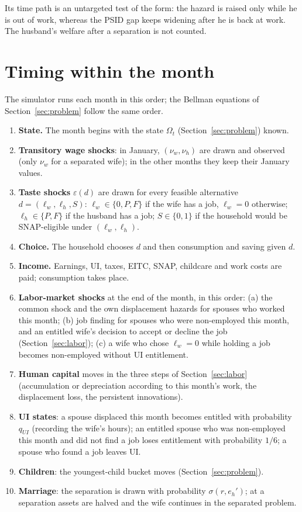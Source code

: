 \documentclass[11pt]{article}
\newcommand{\1}{\mathbf{1}}
\begin{document}
Its time path is an untargeted test of the form: the hazard is raised only while he is out of work, whereas the PSID
gap keeps widening after he is back at work. The husband's welfare after a separation is not counted.

\section{Timing within the month}\label{sec:timing}

The simulator runs each month in this order; the Bellman equations of Section~\ref{sec:problem} follow the same order.
\begin{enumerate}
  \item \textbf{State.} The month begins with the state $\Omega_t$ (Section~\ref{sec:problem}) known.
  \item \textbf{Transitory wage shocks}: in January, $(\nu_w, \nu_h)$ are drawn and observed (only $\nu_w$ for a
  separated wife); in the other months they keep their January values.
  \item \textbf{Taste shocks} $\varepsilon(d)$ are drawn for every feasible alternative $d = (\ell_w, \ell_h, S)$:
  $\ell_w \in \{0, P, F\}$ if the wife has a job, $\ell_w = 0$ otherwise; $\ell_h \in \{P, F\}$ if the husband has a
  job; $S \in \{0, 1\}$ if the household would be SNAP-eligible under $(\ell_w, \ell_h)$.
  \item \textbf{Choice.} The household chooses $d$ and then consumption and saving given $d$.
  \item \textbf{Income.} Earnings, UI, taxes, EITC, SNAP, childcare and work costs are paid; consumption takes place.
  \item \textbf{Labor-market shocks} at the end of the month, in this order: (a) the common shock and the own
  displacement hazards for spouses who worked this month; (b) job finding for spouses who were non-employed this month,
and an entitled wife's decision to accept or decline the job (Section~\ref{sec:labor});
  (c) a wife who chose $\ell_w = 0$ while holding a job becomes non-employed without UI entitlement.
  \item \textbf{Human capital} moves in the three steps of Section~\ref{sec:labor} (accumulation or depreciation
  according to this month's work, the displacement loss, the persistent innovations).
  \item \textbf{UI states}: a spouse displaced this month becomes entitled with probability $q_{UI}$ (recording the
  wife's hours); an entitled spouse who was non-employed this month and did not find a job loses entitlement with
  probability $1/6$; a spouse who found a job leaves UI.
  \item \textbf{Children}: the youngest-child bucket moves (Section~\ref{sec:problem}).
  \item \textbf{Marriage}: the separation is drawn with probability $\sigma(r, e_h')$; at a separation assets are
  halved and the wife continues in the separated problem.
\end{enumerate}
\end{document}
